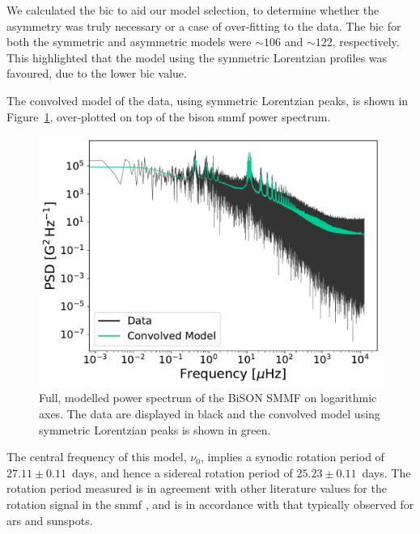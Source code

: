 We calculated the \gls{bic} to aid our model selection, to determine whether the asymmetry was truly necessary or a case of over-fitting to the data. The \gls{bic} for both the symmetric and asymmetric models were $\sim106$ and $\sim122$, respectively. This highlighted that the model using the symmetric Lorentzian profiles was favoured, due to the lower \gls{bic} value. 

The convolved model of the data, using symmetric Lorentzian peaks, is shown in Figure~\ref{fig:BiSON_PSD_fit}, over-plotted on top of the \gls{bison} \gls{smmf} power spectrum.


\begin{figure}[ht!]
	\centering
	\includegraphics[width=\columnwidth]{BiSON_PSD_model.pdf}
	\caption{Full, modelled power spectrum of the BiSON SMMF on logarithmic axes. The data are displayed in black and the convolved model using symmetric Lorentzian peaks is shown in green.}
	\label{fig:BiSON_PSD_fit}
\end{figure}


The central frequency of this model, $\nu_0$, implies a synodic rotation period of $27.11\pm0.11$~days, and hence a sidereal rotation period of $25.23\pm0.11$~days. The rotation period measured is in agreement with other literature values for the rotation signal in the \gls{smmf} \citep{chaplin_studies_2003, xie_temporal_2017}, and is in accordance with that typically observed for \glspl{ar} and sunspots.


